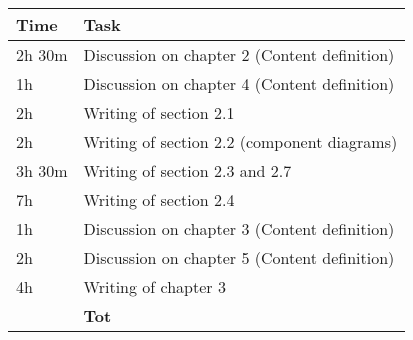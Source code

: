 \begin{center}
    {\renewcommand{\arraystretch}{2}%
    \begin{tabular}{L{2cm}L{12cm}}
        \hline
        \textbf{Time} & \textbf{Task} \\
        \hline
        2h 30m & Discussion on chapter 2 (Content definition) \\
        \hline
        1h & Discussion on chapter 4 (Content definition) \\
        \hline
        2h & Writing of section 2.1 \\
        \hline
        2h & Writing of section 2.2 (component diagrams) \\
        \hline
        3h 30m & Writing of section 2.3 and 2.7 \\
        \hline
        7h & Writing of section 2.4 \\
        \hline
        1h & Discussion on chapter 3 (Content definition) \\
        \hline
        2h & Discussion on chapter 5 (Content definition) \\
        \hline
        4h & Writing of chapter 3 \\
        \hline
        \textbf{} & \textbf{Tot} \\
    \end{tabular}}
\end{center}